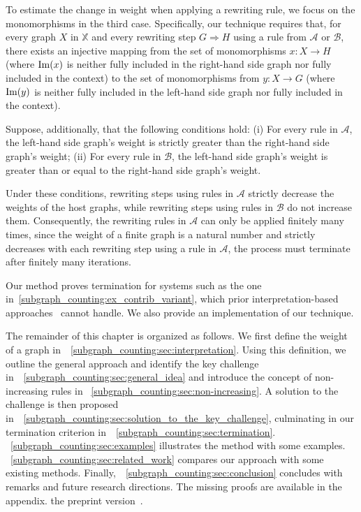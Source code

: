 To estimate the change in weight when applying a rewriting rule, we focus on 
the monomorphisms in the third case. Specifically, our technique requires that, for every graph $X$ in $\mathbb{X}$ and every rewriting step $G \Rightarrow H$ using a rule from $\mathcal{A}$ or $\mathcal{B}$, there exists an injective mapping from the set of monomorphisms $x : X \to H$ (where $\operatorname{Im}(x)$ is neither fully included in the right-hand side graph nor fully included in the context) to the set of monomorphisms from $y : X \to G$ (where $\operatorname{Im}(y)$ is neither fully included in the left-hand side graph nor fully included in the context). 

Suppose, additionally, that the following conditions hold: (i) For every rule in \( \mathcal{A} \), the left-hand side graph's weight is strictly greater than the right-hand side graph's weight; (ii) For every rule in \( \mathcal{B} \), the left-hand side graph's weight is greater than or equal to the right-hand side graph's weight. 

Under these conditions, rewriting steps using rules in \( \mathcal{A} \) strictly decrease the weights of the host graphs, while rewriting steps using rules in \( \mathcal{B} \) do not increase them.
Consequently, the rewriting rules in \( \mathcal{A} \) can only be applied finitely many times, since the weight of a finite graph is a natural number and strictly decreases with each rewriting step using a rule in \( \mathcal{A} \), the process must terminate after finitely many iterations.  
 
Our method proves termination for systems such as the one in~\autoref{subgraph_counting:ex_contrib_variant}, which prior interpretation-based approaches~\cite{zantema2014termination,bruggink2014termination,bruggink2015proving,
endrullis2024generalized_arxiv_v2,
overbeek2024termination_lmcs} cannot handle. 
We also provide an implementation of our technique.  
   
The remainder of this chapter is organized as follows.
We first define the weight of a graph in~\textsection~\ref{subgraph_counting:sec:interpretation}. 
Using this definition, we outline the general approach and identify the key challenge in~\textsection~\ref{subgraph_counting:sec:general_idea} and introduce the concept of non-increasing rules in \textsection~\ref{subgraph_counting:sec:non-increasing}. 
A solution to the challenge is then proposed in~\textsection~\ref{subgraph_counting:sec:solution_to_the_key_challenge}, culminating in our termination criterion in~\textsection~\ref{subgraph_counting:sec:termination}.
\textsection~\ref{subgraph_counting:sec:examples} illustrates the method with some examples.
\textsection~\ref{subgraph_counting:sec:related_work} compares our approach with some existing methods.
Finally,~\textsection~\ref{subgraph_counting:sec:conclusion} concludes with remarks and future research directions. The missing proofs are available in 
\iflongversion
the appendix.
\else
the preprint version~\cite{qiu2025termination}.
\fi